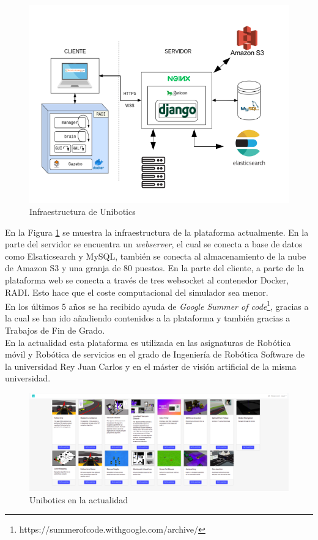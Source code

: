 \begin{figure}[H]
    \centering
    \includegraphics[width=13cm, keepaspectratio]{img/infraestructura.png}
    \caption{Infraestructura de Unibotics}
    \label{fig:infra}
\end{figure}
\newpage
En la Figura \ref{fig:infra} se muestra la infraestructura de la plataforma actualmente. En la parte del servidor se encuentra un \textit{webserver}, el cual se conecta a base de datos como Elsaticsearch y MySQL, también se conecta al almacenamiento de la nube de Amazon S3 y una granja de 80 puestos. En la parte del cliente, a parte de la plataforma web se conecta a través de tres websocket al contenedor Docker, RADI. Esto hace que el coste computacional del simulador sea menor.\\

En los últimos 5 años se ha recibido ayuda de \textit{Google Summer of code}\footnote{https://summerofcode.withgoogle.com/archive/}, gracias a la cual se han ido añadiendo contenidos a la plataforma y también gracias a Trabajos de Fin de Grado.\\

En la actualidad esta plataforma es utilizada en las asignaturas de Robótica móvil y Robótica de servicios en el grado de Ingeniería de Robótica Software de la universidad Rey Juan Carlos y en el máster de visión artificial de la misma universidad.

\begin{figure}[H]
    \centering
    \includegraphics[width=15cm, keepaspectratio]{img/unibotics.png}
    \caption{Unibotics en la actualidad}
    \label{fig:unibotics}
\end{figure}

